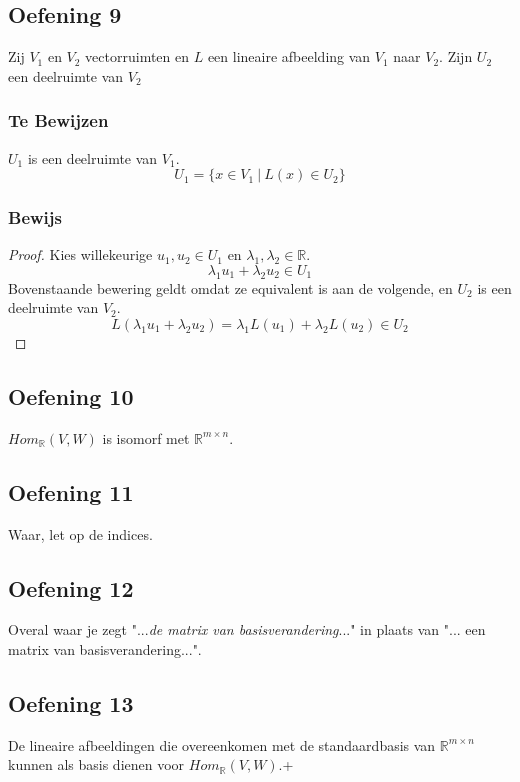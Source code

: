 \documentclass[lineaire_algebra_oplossingen.tex]{subfiles}
\begin{document}
\subsection{Oefening 9}
Zij $V_1$ en $V_2$ vectorruimten en $L$ een lineaire afbeelding van $V_1$ naar $V_2$. Zijn $U_2$ een deelruimte van $V_2$

\subsubsection*{Te Bewijzen}
$U_1$ is een deelruimte van $V_1$.
\[
U_1 = \{x \in V_1\ |\  L(x) \in U_2 \}
\]

\subsubsection*{Bewijs}
\begin{proof}
Kies willekeurige $u_1, u_2 \in U_1$ en $\lambda_1,\lambda_2 \in \mathbb{R}$.
\[
\lambda_1u_1 + \lambda_2u_2 \in U_1
\]
Bovenstaande bewering geldt omdat ze equivalent is aan de volgende, en $U_2$ is een deelruimte van $V_2$.
\[
L(\lambda_1u_1 + \lambda_2u_2)
=\lambda_1L(u_1) + \lambda_2L(u_2)
 \in U_2
\]
\end{proof}

\subsection{Oefening 10}
$Hom_{\mathbb{R}}(V,W)$ is isomorf met $\mathbb{R}^{m\times n}$.

\subsection{Oefening 11}
Waar, let op de indices.

\subsection{Oefening 12}
Overal waar je zegt "...\emph{de matrix van basisverandering}..." in plaats van "... een matrix van basisverandering...".

\subsection{Oefening 13}
De lineaire afbeeldingen die overeenkomen met de standaardbasis van $\mathbb{R}^{m\times n}$ kunnen als basis dienen voor $Hom_\mathbb{R}(V,W)$.+
\end{document}
